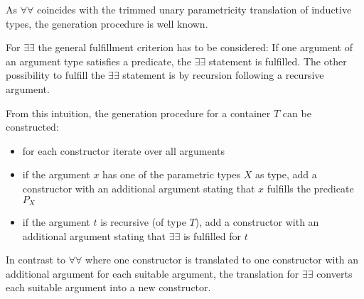 As $\forall\forall$ coincides with the trimmed unary parametricity translation 
of inductive types, the generation procedure is well known.

For $\exists\exists$ the general fulfillment criterion has to be considered:
If one argument of an argument type satisfies a predicate, the $\exists\exists$ 
statement is fulfilled. The other possibility to fulfill the $\exists\exists$ statement
is by recursion following a recursive argument.

From this intuition, the generation procedure for a container $T$ can be constructed:
\begin{itemize}
\itemsep0em 
    \item for each constructor iterate over all arguments
    \item if the argument $x$ has one of the parametric types $X$ as type,
        add a constructor with an additional argument stating that
            $x$ fulfills the predicate $P_X$
    \item if the argument $t$ is recursive (of type $T$), add a constructor 
        with an additional argument stating that $\exists\exists$ is fulfilled for $t$
\end{itemize}

In contrast to $\forall\forall$ where one constructor is translated to 
one constructor with an additional argument for each suitable argument,
the translation for $\exists\exists$ converts each suitable argument into a new constructor.




